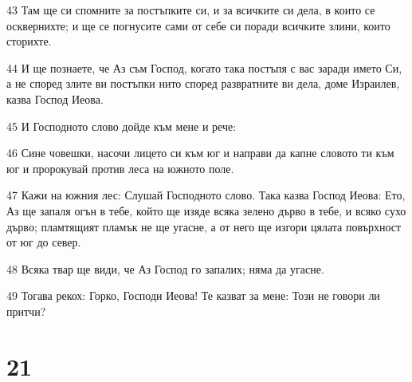 \par 43 Там ще си спомните за постъпките си, и за всичките си дела, в които се осквернихте; и ще се погнусите сами от себе си поради всичките злини, които сторихте.
\par 44 И ще познаете, че Аз съм Господ, когато така постъпя с вас заради името Си, а не според злите ви постъпки нито според развратните ви дела, доме Израилев, казва Господ Иеова.
\par 45 И Господното слово дойде към мене и рече:
\par 46 Сине човешки, насочи лицето си към юг и направи да капне словото ти към юг и пророкувай против леса на южното поле.
\par 47 Кажи на южния лес: Слушай Господното слово. Така казва Господ Иеова: Ето, Аз ще запаля огън в тебе, който ще изяде всяка зелено дърво в тебе, и всяко сухо дърво; пламтящият пламък не ще угасне, а от него ще изгори цялата повърхност от юг до север.
\par 48 Всяка твар ще види, че Аз Господ го запалих; няма да угасне.
\par 49 Тогава рекох: Горко, Господи Иеова! Те казват за мене: Този не говори ли притчи?

\chapter{21}

